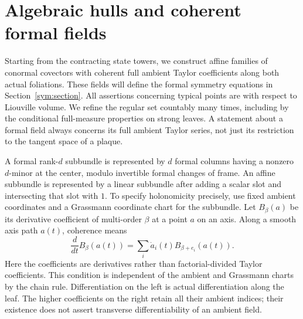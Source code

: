 \section{Algebraic hulls and coherent formal fields}
\label{hull:section}

Starting from the contracting state towers, we construct affine families
of conormal covectors with coherent full ambient Taylor coefficients
along both actual foliations. These fields will define the formal
symmetry equations in Section~\ref{sym:section}.
All assertions concerning typical points are with respect to Liouville
volume. We refine the regular set countably many times, including by the
conditional full-measure properties on strong leaves. A statement about a
formal field always concerns its full ambient Taylor series, not just its
restriction to the tangent space of a plaque.

A formal rank-$d$ subbundle is represented by $d$ formal columns
having a nonzero $d$-minor at the center, modulo invertible formal
changes of frame. An affine subbundle is represented by a linear
subbundle after adding a scalar slot and intersecting that slot with
$1$. To specify holonomicity precisely, use fixed ambient coordinates
and a Grassmann coordinate chart for the subbundle. Let $B_\beta(a)$
be its derivative coefficient of multi-order $\beta$ at a point $a$
on an axis. Along a smooth axis path $a(t)$, coherence means
\[
 \frac{d}{dt}B_\beta(a(t))
 =\sum_i \dot a_i(t) B_{\beta+e_i}(a(t)).
\]
Here the coefficients are derivatives rather than factorial-divided
Taylor coefficients. This condition is independent of the ambient
and Grassmann charts by the chain rule. Differentiation on the left is
actual differentiation along the leaf. The higher coefficients on the
right retain all their ambient indices; their existence does not
assert transverse differentiability of an ambient field.

